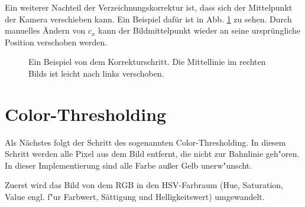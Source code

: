 \documentclass[arbeit=studie,oneside,BCOR=12mm]{ArbeitRST}
\begin{document}
Ein weiterer Nachteil der Verzeichnungskorrektur ist, dass sich der Mittelpunkt der
Kamera verschieben kann. Ein Beispiel dafür ist in Abb. \ref{shifted} zu sehen. Durch
manuelles Ändern von $c_x$ kann der Bildmittelpunkt wieder an seine
ursprüngliche Position verschoben werden. 

\begin{figure}[h]
    \centering
    \caption{Ein Beispiel von dem Korrekturschritt. Die Mittellinie im
    rechten Bilds ist leicht nach links verschoben.}
    \label{shifted}
\end{figure}

\section{\glqq Color-Thresholding\grqq}

Als Nächstes folgt der Schritt des sogenannten \glqq Color-Thresholding\grqq. In diesem
Schritt werden alle Pixel aus dem Bild entfernt, die nicht zur Bahnlinie geh"oren.
In dieser Implementierung sind alle Farbe au{\ss}er Gelb unerw"unscht.

Zuerst wird das Bild von dem RGB in den HSV-Farbraum (Hue, Saturation, Value engl. f"ur Farbwert, Sättigung und
Helligkeitswert) umgewandelt. 
\end{document}
